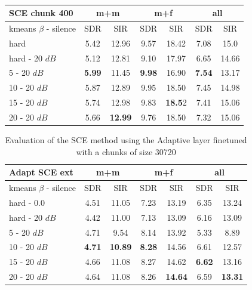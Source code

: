 \documentclass[master, tikz, final,11pt, dvipdfmx]{iscs-thesis}
\begin{document}
\begin{table}[h!]
\centering
\begin{tabular}{l|c|c|c|c|c|c}
SCE chunk 400 & \multicolumn{2}{c|}{m+m} & \multicolumn{2}{c|}{m+f} & \multicolumn{2}{c}{all} \\ 
\hline 
kmeans $\beta$ - silence & SDR & SIR & SDR & SIR & SDR & SIR \\ 
\hline
hard  & 5.42 & 12.96 & 9.57 & 18.42 & 7.08 & 15.0 \\ 
hard - 20 $dB$  & 5.12 & 12.81 & 9.10 & 17.97 & 6.65 & 14.66 \\
\hline
\hline
5 - 20 $dB$  & \cellcolor{green}\textbf{5.99} & \cellcolor{green}11.45 & \cellcolor{green}\textbf{9.98} & \cellcolor{green}16.90 & \cellcolor{green}\textbf{7.54} & \cellcolor{green}13.17 \\ 
10 - 20 $dB$  & 5.87 & 12.89 & 9.95 & 18.50 & 7.45 & 14.98 \\ 
15 - 20 $dB$ & 5.74 & 12.98 & 9.83 & \textbf{18.5}2 & 7.41 & 15.06 \\ 
20 - 20 $dB$ & 5.66 & \textbf{12.99} & 9.76 & 18.50 & 7.32 & 15.06 \\ 
\end{tabular}
\captionsetup{justification=centering}
\caption{}
\label{table:SCE400}
\end{table}

\begin{table}[h!]
\centering
\begin{tabular}{l|c|c|c|c|c|c}
Adapt SCE ext & \multicolumn{2}{c|}{m+m} & \multicolumn{2}{c|}{m+f} & \multicolumn{2}{c}{all} \\ 
\hline 
kmeans $\beta$ - silence & SDR & SIR & SDR & SIR & SDR & SIR \\ 
\hline
hard - 0.0  & 4.51 & 11.05 & 7.23 & 13.19 & 6.35 & 13.24 \\ 
hard - 20 $dB$  & 4.42 & 11.00 & 7.13 & 13.09 & 6.16 & 13.09 \\
\hline
\hline
5 - 20 $dB$  & 4.71 & 9.54 & 8.14 & 13.92 & 5.33 & 8.89 \\ 
10 - 20 $dB$  & \cellcolor{green}\textbf{4.71} & \cellcolor{green}\textbf{10.89} & \cellcolor{green}\textbf{8.28} & \cellcolor{green}14.56 & 6.61 & 12.57 \\ 
15 - 20 $dB$ & 4.66 & 11.08 & 8.27 & 14.62 & \cellcolor{green}\textbf{6.62} & \cellcolor{green}13.16 \\ 
20 - 20 $dB$ & 4.64 & 11.08 & 8.26 & \textbf{14.64} & 6.59 & \textbf{13.31} \\ 
\end{tabular}
\caption{Evaluation of the SCE method using the Adaptive layer finetuned with a chunks of size 30720}
\label{table:AdaptSCEext}
\end{table}
\end{document}
